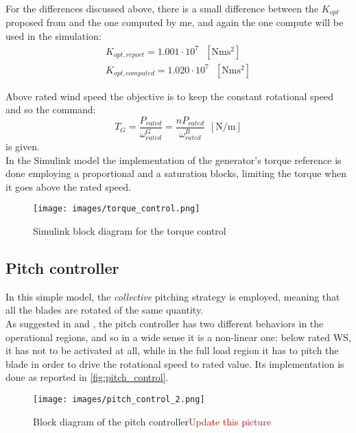  For the differences discussed above, there is a small difference between the $K_{opt}$ proposed from \cite{DTU_Wind_Energy_Report-I-0092} and the one computed by me, and again the one compute will be used in the simulation:
 \begin{gather*}
     K_{opt, report} = 1.001 \cdot 10^7 \ \ \ \left[\si{\newton\meter\square\second}\right] \\
     K_{opt, computed} = 1.020 \cdot 10^7 \ \ \ \left[\si{\newton\meter\square\second}\right] 
 \end{gather*}

Above rated wind speed the objective is to keep the constant rotational speed and so the command:
\begin{equation}
    T_G = \frac{P_{rated}}{\omega_{rated}^G} = \frac{nP_{rated}}{\omega_{rated}^R}\ \ \left[\si{\newton\per\meter}\right]
    \label{eq:T_G3}
\end{equation}
is given.\\
In the Simulink model the implementation of the generator's torque reference is done employing a proportional and a saturation blocks, limiting the torque when it goes above the rated speed.
\begin{figure}[htb]
    \centering
    \texttt{[image: images/torque\_control.png]}
    \caption{Simulink block diagram for the torque control}
    \label{fig:torque_control}
\end{figure}

\subsection{Pitch controller}
In this simple model, the \textit{collective} pitching strategy is employed, meaning that all the blades are rotated of the same quantity.\\
As suggested in \cite{Aerodynamics_of_wind_turbines} and \cite{SMILDEN2016386}, the pitch controller has two different behaviors in the operational regions, and so in a wide sense it is a non-linear one: below rated \acrshort{WS}, it has not to be activated at all, while in the full load region it has to pitch the blade in order to drive the rotational speed to rated value. Its implementation is done as reported in \autoref{fig:pitch_control}.
\begin{figure}[htb]
    \centering
    \texttt{[image: images/pitch\_control\_2.png]}
    \caption{Block diagram of the pitch controller\textcolor{red}{Update this picture}}
    \label{fig:pitch_control}
\end{figure}

